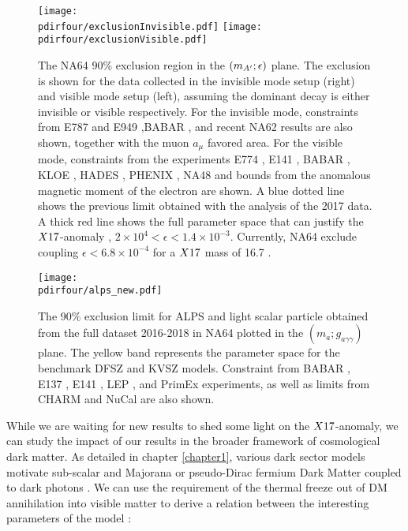\begin{figure}[tbh!]
  \centering
  \texttt{[image: \\pdirfour/exclusionInvisible.pdf]}
  \texttt{[image: \\pdirfour/exclusionVisible.pdf]}
  \caption[Exclusion limits in the $\dmplane$]{The NA64 90\% exclusion region in the $\dmplane$ plane. The exclusion is shown for the data collected in the invisible mode setup (right) and visible mode setup (left), assuming the dominant decay is either invisible or visible respectively\cite{NA64:2019imj,Banerjee:2019hmi}. For the invisible mode, constraints from E787 and E949 \cite{PhysRevD.89.095006,Essig:2013vha},BABAR \cite{PhysRevLett.119.131804}, and recent NA62 results \cite{CortinaGil:2019nuo} are also shown, together with the muon $a_{\mu}$ favored area. For the visible mode, constraints from the experiments E774 \cite{PhysRevLett.67.2942}, E141 \cite{PhysRevLett.59.755}, BABAR \cite{babar1}, KLOE \cite{kloe2}, HADES \cite{hades}, PHENIX \cite{phenix}, NA48 \cite{na48} and bounds from the anomalous magnetic moment of the electron \cite{PhysRevD.89.095006} are shown. A blue dotted line shows the previous limit obtained with the analysis of the 2017 data. A thick red line shows the full parameter space that can justify the $X17$-anomaly \cite{PhysRevD.95.035017}, $2 \times 10^{4} < \epsilon< 1.4 \times 10^{-3}$. Currently, NA64 exclude coupling $\epsilon < 6.8 \times 10^{-4}$ for a $X17$ mass of 16.7 \mev.}
  \label{fig:exclusion-dmplane}
\end{figure}

\begin{figure}[bth!]
  \centering
  \texttt{[image: \\pdirfour/alps\_new.pdf]}
  \caption[Exclusion limits in the $(m_{a};g_{a \gamma \gamma})$ plane for ALPS and light scalar]{The 90\% exclusion limit for ALPS and light scalar particle obtained from the full dataset 2016-2018 in NA64 plotted in the $(m_{a};g_{a \gamma \gamma})$ plane. The yellow band represents the parameter space for the benchmark DFSZ \cite{DINE1981199} and KVSZ \cite{PhysRevLett.43.103} models. Constraint from BABAR \cite{Dolan:2017osp}, E137 \cite{e137}, E141 \cite{e141}, LEP , and PrimEx \cite{PhysRevLett.123.071801} experiments, as well as limits from CHARM \cite{BERGSMA1985458} and NuCal \cite{Dobrich:2019dxc} are also shown.}
  \label{fig:exclusion-dmplane-alps}
\end{figure}

While we are waiting for new results to shed some light on the $X17$-anomaly, we can study the impact of our results in the broader framework of cosmological dark matter. As detailed in chapter \ref{chapter1}, various dark sector models motivate sub-\gev scalar and Majorana or pseudo-Dirac fermium Dark Matter coupled to dark photons \cite{battaglieri2017cosmic}. We can use the requirement of the thermal freeze out of DM annihilation into visible matter to derive a relation between the interesting parameters of the model \cite{na64-prd}:


